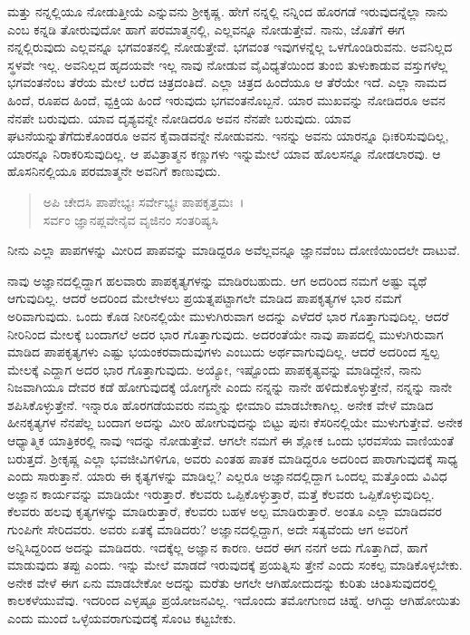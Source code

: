 ಮತ್ತು ನನ್ನಲ್ಲಿಯೂ ನೋಡುತ್ತೀಯೆ ಎನ್ನುವನು ಶ‍್ರೀಕೃಷ್ಣ. ಹೇಗೆ ನನ್ನಲ್ಲಿ ನನ್ನಿಂದ ಹೊರಗಡೆ ಇರುವುದನ್ನೆಲ್ಲಾ ನಾನು ಎಂಬ ಕನ್ನಡಿ ತೋರುವುದೋ ಹಾಗೆ ಪರಮಾತ್ಮನಲ್ಲಿ, ಎಲ್ಲವನ್ನೂ ನೋಡುತ್ತೇವೆ. ನಾನು, ಜೊತೆಗೆ ಈಗ ನನ್ನಲ್ಲಿರುವುದು ಎಲ್ಲವನ್ನೂ ಭಗವಂತನಲ್ಲಿ ನೋಡುತ್ತೇವೆ. ಭಗವಂತ ಇವುಗಳನ್ನೆಲ್ಲ ಒಳಗೊಂಡಿರುವನು. ಅವನಿಲ್ಲದ ಸ್ಥಳವೇ ಇಲ್ಲ. ಅವನಿಲ್ಲದ ಹೃದಯವೇ ಇಲ್ಲ ನಾವು ನೋಡುವ ವೈವಿಧ್ಯತೆಯಿಂದ ತುಂಬಿ ತುಳುಕಾಡುವ ವಸ್ತುಗಳೆಲ್ಲ ಭಗವಂತನೆಂಬ ತೆರೆಯ ಮೇಲೆ ಬರೆದ ಚಿತ್ರದಂತಿದೆ. ಎಲ್ಲಾ ಚಿತ್ರದ ಹಿಂದೆಯೂ ಆ ತೆರೆಯೇ ಇದೆ. ಎಲ್ಲಾ ನಾಮದ ಹಿಂದೆ, ರೂಪದ ಹಿಂದೆ, ವ್ಟಕ್ತಿಯ ಹಿಂದೆ ಇರುವುದು ಭಗವಂತನೊಬ್ಬನೆ. ಯಾರ ಮುಖವನ್ನು ನೋಡಿದರೂ ಅವನ ನೆನಪೇ ಬರುವುದು. ಯಾವ ದೃಶ್ಯವನ್ನೇ ನೋಡಿದರೂ ಅವನ ನೆನಪೇ ಬರುವುದು. ಯಾವ ಘಟನೆಯನ್ನುತೆಗೆದುಕೊಂಡರೂ ಅವನ ಕೈವಾಡವನ್ನೇ ನೋಡುವನು. ಇನನ್ನು ಅವನು ಯಾರನ್ನೂ ಧಿಃಕರಿಸುವುದಿಲ್ಲ, ಯಾರನ್ನೂ ನಿರಾಕರಿಸುವುದಿಲ್ಲ. ಆ ಪವಿತ್ರಾತ್ಮನ ಕಣ್ಣುಗಳು ಇನ್ನುಮೇಲೆ ಯಾವ ಹೊಲಸನ್ನೂ ನೋಡಲಾರವು. ಆ ಹೊಸನಿನಲ್ಲಿಯೂ ಪರಮಾತ್ಮನೇ ಅವನಿಗೆ ಕಾಣುವುದು.

\begin{verse}
ಅಪಿ ಚೇದಸಿ ಪಾಪೇಭ್ಯಃ ಸರ್ವೇಭ್ಯಃ ಪಾಪಕೃತ್ತಮಃ~।\\ಸರ್ವಂ ಜ್ಞಾನಪ್ಲವೇನೈವ ವೃಜಿನಂ ಸಂತರಿಷ್ಯಸಿ 
\end{verse}

{\small ನೀನು ಎಲ್ಲಾ ಪಾಪಗಳನ್ನು ಮೀರಿದ ಪಾಪವನ್ನು ಮಾಡಿದ್ದರೂ ಅವೆಲ್ಲವನ್ನೂ ಜ್ಞಾನವೆಂಬ ದೋಣಿಯಿಂದಲೇ ದಾಟುವೆ.}

ನಾವು ಅಜ್ಞಾನದಲ್ಲಿದ್ದಾಗ ಹಲವಾರು ಪಾಪಕೃತ್ಯಗಳನ್ನು ಮಾಡಿರಬಹುದು. ಆಗ ಅದರಿಂದ ನಮಗೆ ಅಷ್ಟು ವ್ಯಥೆ ಆಗುವುದಿಲ್ಲ. ಆದರೆ ಅದರಿಂದ ಮೇಲೇಳಲು ಪ್ರಯತ್ನಪಟ್ಟಾಗಲೇ ಮಾಡಿದ ಪಾಪಕೃತ್ಯಗಳ ಭಾರ ನಮಗೆ ಅರಿವಾಗುವುದು. ಒಂದು ಕೊಡ ನೀರಿನಲ್ಲಿಯೇ ಮುಳುಗಿರುವಾಗ ಅದನ್ನು ಎಳೆದರೆ ಭಾರ ಗೊತ್ತಾಗುವುದಿಲ್ಲ. ಆದರೆ ನೀರಿನಿಂದ ಮೇಲಕ್ಕೆ ಬಂದಾಗಲೆ ಅದರ ಭಾರ ಗೊತ್ತಾಗುವುದು. ಅದರಂತೆಯೇ ನಾವು ಪಾಪದಲ್ಲಿ ಮುಳುಗಿರುವಾಗ ಮಾಡಿದ ಪಾಪಕೃತ್ಯಗಳು ಎಷ್ಟು ಭಯಂಕರವಾದುವುಗಳು ಎಂಬುದು ಅರ್ಥವಾಗುವುದಿಲ್ಲ. ಆದರೆ ಅದರಿಂದ ಸ್ವಲ್ಪ ಮೇಲಕ್ಕೆ ಎದ್ದಾಗ ಅದರ ಭಾರ ಗೊತ್ತಾಗುವುದು. ಅಯ್ಯೋ, ಇಷ್ಟೊಂದು ಪಾಪಕೃತ್ಯವನ್ನು ಮಾಡಿದ್ದೇನೆ, ನಾನು ನಿಜವಾಗಿಯೂ ದೇವರ ಕಡೆ ಹೋಗುವುದಕ್ಕೆ ಯೋಗ್ಯನೇ ಎಂದು ನನ್ನನ್ನು ನಾನೇ ಹಳಿದುಕೊಳ್ಳುತ್ತೇನೆ, ನನ್ನನ್ನು ನಾನೇ ಶಪಿಸಿಕೊಳ್ಳುತ್ತೇನೆ. ಇನ್ನಾರೂ ಹೊರಗಡೆಯವರು ನಮ್ಮನ್ನು ಛೀಮಾರಿ ಮಾಡಬೇಕಾಗಿಲ್ಲ. ಅನೇಕ ವೇಳೆ ಮಾಡಿದ ಹೀನಕೃತ್ಯಗಳ ನೆನಪೆಲ್ಲ ಬಂದಾಗ ಅದನ್ನು ಮೀರಿ ಹೋಗುವುದನ್ನು ಬಿಟ್ಟು ಪುನಃ ಕೆಸರಿನಲ್ಲಿಯೇ ಮುಳುಗುತ್ತೇವೆ. ಅನೇಕ ಆಧ್ಯಾತ್ಮಿಕ ಯಾತ್ರಿಕರಲ್ಲಿ ನಾವು ಇದನ್ನು ನೋಡುತ್ತೇವೆ. ಆಗಲೇ ನಮಗೆ ಈ ಶ್ಲೋಕ ಒಂದು ಭರವಸೆಯ ವಾಣಿಯಂತೆ ಬರುತ್ತದೆ. ಶ‍್ರೀಕೃಷ್ಣ ಎಲ್ಲಾ ಭವಜೀವಿಗಳಿಗೂ, ಅವರು ಎಂತಹ ಪಾತಕ ಮಾಡಿದ್ದರೂ ಅದರಿಂದ ಪಾರಾಗುವುದಕ್ಕೆ ಸಾಧ್ಯ ಎಂದು ಸಾರುತ್ತಾನೆ. ಯಾರು ಈ ಕೃತ್ಯಗಳನ್ನು ಮಾಡಿಲ್ಲ? ಎಲ್ಲರೂ ಅಜ್ಞಾನದಲ್ಲಿದ್ದಾಗ ಒಂದಲ್ಲ ಮತ್ತೊಂದು ವಿವಿಧ ಅಜ್ಞಾನ ಕಾರ್ಯವನ್ನು ಮಾಡಿಯೇ ಇರುತ್ತಾರೆ. ಕೆಲವರು ಒಪ್ಪಿಕೊಳ್ಳುತ್ತಾರೆ, ಮತ್ತೆ ಕೆಲವರು ಒಪ್ಪಿಕೊಳ್ಳುವುದಿಲ್ಲ. ಕೆಲವರು ಹಲವು ಕೃತ್ಯಗಳನ್ನು ಮಾಡಿರುತ್ತಾರೆ, ಕೆಲವರು ಬಹಳ ಅಲ್ಪ ಮಾಡಿರುತ್ತಾರೆ. ಅಂತೂ ಎಲ್ಲಾ ಮಾಡಿದವರ ಗುಂಪಿಗೇ ಸೇರಿದವರು. ಅವರು ಏತಕ್ಕೆ ಮಾಡಿದರು? ಅಜ್ಞಾನದಲ್ಲಿದ್ದಾಗ, ಅದೇ ಸತ್ಯವೆಂದು ಆಗ ಅವರಿಗೆ ಅನ್ನಿಸಿದ್ದರಿಂದ ಅದನ್ನು ಮಾಡಿದರು. ಇದಕ್ಕೆಲ್ಲ ಅಜ್ಞಾನ ಕಾರಣ. ಆದರೆ ಈಗ ನನಗೆ ಅದು ಗೊತ್ತಾಗಿದೆ, ಹಾಗೆ ಮಾಡುವುದು ತಪ್ಪು ಎಂದು. ಇನ್ನು ಮೇಲೆ ಮಾಡದೆ ಇರುವುದಕ್ಕೆ ಪ್ರಯತ್ನಿಸು ತ್ತೇನೆ ಎಂದು ಸಂಕಲ್ಪ ಮಾಡಿಕೊಳ್ಳಬೇಕು. ಅನೇಕ ವೇಳೆ ಈಗ ಏನು ಮಾಡಬೇಕೋ ಅದನ್ನು ಮರೆತು ಆಗಲೇ ಆಗಿಹೋದುದನ್ನು ಕುರಿತು ಚಿಂತಿಸುವುದರಲ್ಲಿ ಕಾಲಕಳೆಯುವೆವು. ಇದರಿಂದ ಎಳ್ಳಷ್ಟೂ ಪ್ರಯೋಜನವಿಲ್ಲ. ಇದೊಂದು ತಮೋಗುಣದ ಚಿಹ್ನೆ. ಆಗಿದ್ದು ಆಗಿಹೋಯಿತು ಎಂದು ಮುಂದೆ ಒಳ್ಳೆಯವರಾಗುವುದಕ್ಕೆ ಸೊಂಟ ಕಟ್ಟಬೇಕು.

